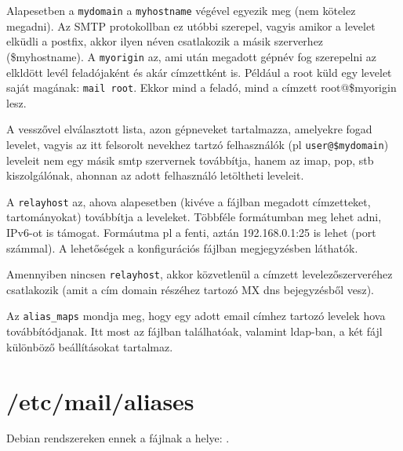 

Alapesetben a \texttt{mydomain} a \texttt{myhostname} végével egyezik meg (nem kötelez megadni). Az SMTP protokollban
ez utóbbi szerepel, vagyis amikor a levelet elküdli a postfix, akkor ilyen néven csatlakozik a másik szerverhez
(\$myhostname). A \texttt{myorigin} az, ami után megadott gépnév fog szerepelni az elkldött levél feladójaként és akár
címzettként is. Például a root küld egy levelet saját magának: \texttt{mail root}. Ekkor mind a feladó, mind a címzett
root@\$myorigin lesz.

A  vesszővel elválasztott lista, azon gépneveket tartalmazza, amelyekre fogad levelet, vagyis az
itt felsorolt nevekhez tartzó felhasználók (pl \texttt{user@\$mydomain}) leveleit nem egy másik smtp szervernek
továbbítja, hanem az imap, pop, stb kiszolgálónak, ahonnan az adott felhasználó letöltheti leveleit.

A \texttt{relayhost} az, ahova alapesetben (kivéve a  fájlban megadott címzetteket,
tartományokat) továbbítja a leveleket. Többféle formátumban meg lehet adni, IPv6-ot is támogat. Formáutma pl a fenti,
aztán 192.168.0.1:25 is lehet (port számmal). A lehetőségek a konfigurációs fájlban megjegyzésben láthatók.

Amennyiben nincsen \texttt{relayhost}, akkor közvetlenül a címzett levelezőszerveréhez csatlakozik (amit a cím domain
részéhez tartozó MX dns bejegyzésből vesz).

Az \texttt{alias\_maps} mondja meg, hogy egy adott email címhez tartozó levelek hova továbbítódjanak. Itt most az
 fájlban találhatóak, valamint ldap-ban, a két fájl különböző beállításokat tartalmaz.

\section{/etc/mail/aliases}
Debian rendszereken ennek a fájlnak a helye: .

